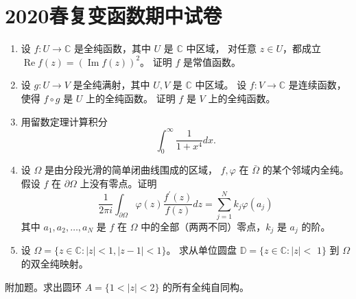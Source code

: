 \section{2020春复变函数期中试卷}
\begin{enumerate}
\item 设 $f: U \rightarrow \mathbb{C}$ 是全纯函数，其中 $U$ 是 $\mathbb{C}$ 中区域，
对任意 $z \in U$，都成立 $\operatorname{Re} f(z)=(\operatorname{Im} f(z))^2$。
证明 $f$ 是常值函数。
\item 设 $g: U \rightarrow V$ 是全纯满射，其中 $U, V$ 是 $\mathbb{C}$ 中区域。
设 $f: V \rightarrow \mathbb{C}$ 是连续函数，使得 $f \circ g$ 是 $U$ 上的全纯函数。
证明 $f$ 是 $V$ 上的全纯函数。
\item 用留数定理计算积分
\[\int_0^{\infty} \frac{1}{1+x^4} dx.\]
\item 设 $\Omega$ 是由分段光滑的简单闭曲线围成的区域，
$f, \varphi$ 在 $\bar{\Omega}$ 的某个邻域内全纯。
假设 $f$ 在 $\partial \Omega$ 上没有零点。证明
\[\frac{1}{2 \pi i} \int_{\partial \Omega} \varphi(z) \frac{f^{\prime}(z)}{f(z)} d z
=\sum_{j=1}^N k_j \varphi(a_j)\]
其中 $a_1, a_2, \ldots, a_N$ 是 $f$ 在 $\Omega$ 中的全部（两两不同）零点，$k_j$ 是 $a_j$ 的阶。
\item 设 $\Omega=\{z \in \mathbb{C}:|z|<1,|z-1|<1\}$。
求从单位圆盘 $\mathbb{D}=\{z \in \mathbb{C}:|z|<$ $1\}$ 到 $\Omega$ 的双全纯映射。
\end{enumerate}
附加题。求出圆环 $A=\{1<|z|<2\}$ 的所有全纯自同构。


